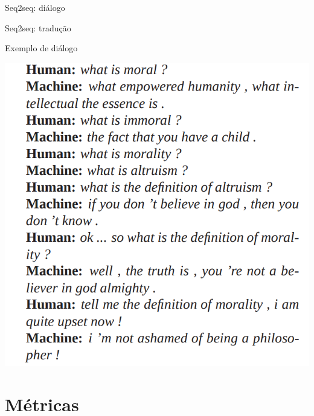 \documentclass[10pt]{beamer}
\begin{document}
\begin{frame}{Seq2seq: diálogo \cite{DBLP:journals/corr/VinyalsL15}}

\end{frame}


\begin{frame}{Seq2seq: tradução \cite{luzfinger2017}}

\end{frame}

\begin{frame}{Exemplo de diálogo \cite{DBLP:journals/corr/VinyalsL15}}
\begin{center}
\includegraphics[scale=0.3]{images/exemplo1.png}
\end{center}
\end{frame}


\section{Métricas}
\end{document}

